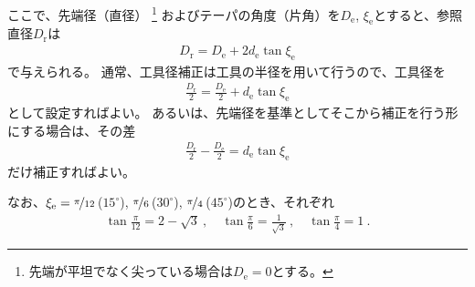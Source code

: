 ここで、先端径（直径）
\footnote{先端が平坦でなく尖っている場合は$D_\mathrm e = 0$とする。}
およびテーパの角度（片角）を$D_\mathrm e$, $\xi_\mathrm e$とすると、参照直径$D_\mathrm r$は
\begin{align*}
  D_\mathrm r = D_\mathrm e+2d_\mathrm e\tan\xi_\mathrm e
\end{align*}
で与えられる。
通常、工具径補正は工具の半径を用いて行うので、工具径を
\begin{align*}
  \frac{D_\mathrm r}2 = \frac{D_\mathrm e}2+d_\mathrm e\tan\xi_\mathrm e
\end{align*}
として設定すればよい。
あるいは、先端径を基準としてそこから補正を行う形にする場合は、その差
\begin{align*}
  \frac{D_\mathrm r}2-\frac{D_\mathrm e}2 = d_\mathrm e\tan\xi_\mathrm e
\end{align*}
だけ補正すればよい。
\begin{hosoku}
なお、$\xi_\mathrm e = \nicefrac\pi{12}$\,($15^\circ$), $\nicefrac\pi6$\,($30^\circ$), $\nicefrac\pi4$\,($45^\circ$)のとき、それぞれ
\begin{align*}
  \tan\frac\pi{12} = 2-\sqrt3\ , \quad
  \tan\frac\pi6 = \frac1{\sqrt3}\ , \quad
  \tan\frac\pi4 = 1\ .
\end{align*}
\end{hosoku}



